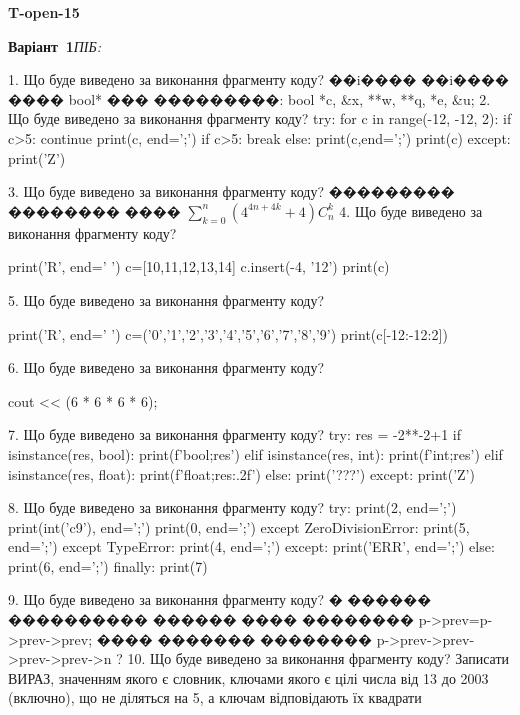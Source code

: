 \documentclass[11pt]{article}
\begin{document}
{\large\textbf{T-open-15}}

\textbf{Варіант \No\,1}\hfill \textit{ПІБ:}\,\underline{\hspace{60mm}}
\vspace{4mm}

1. Що буде виведено за виконання фрагменту коду?
��i���� ��i���� ���� bool* ��� ���������: bool *c, &x, **w, **q, *e, &u;
2. Що буде виведено за виконання фрагменту коду?
try:
    for c in range(-12, -12, 2):
        if c>5:
            continue
        print(c, end=';')
        if c>5:
            break
    else:
        print(c,end=';')
    print(c)
except:
    print('Z')

3. Що буде виведено за виконання фрагменту коду?
��������� �������� ���� {$\sum\limits_{k=0}^{n} \left({{4^{4n+4k}}+4}\right){C_n^k}$}
4. Що буде виведено за виконання фрагменту коду?

print('R', end=' ')
c=[10,11,12,13,14]
c.insert(-4, '12')
print(c)


5. Що буде виведено за виконання фрагменту коду?

print('R', end=' ')
c=('0','1','2','3','4','5','6','7','8','9')
print(c[-12:-12:2])


6. Що буде виведено за виконання фрагменту коду?

cout << (6 * 6 * 6 * 6);

7. Що буде виведено за виконання фрагменту коду?
try:
    res = -2**-2+1
    if isinstance(res, bool):
        print(f'bool;{res}')
    elif isinstance(res, int):
        print(f'int;{res}')
    elif isinstance(res, float):
        print(f'float;{res:.2f}')
    else:
        print('???')
except:
    print('Z')

8. Що буде виведено за виконання фрагменту коду?
try:
    print(2, end=';')
    print(int('c9'), end=';')
    print(0, end=';')
except ZeroDivisionError:
    print(5, end=';')
except TypeError:
    print(4, end=';')
except:
    print('ERR', end=';')
else:
    print(6, end=';')
finally:
    print(7)

9. Що буде виведено за виконання фрагменту коду?
� ������ ���������� ������ ���� �������� p->prev=p->prev->prev;
���� ������� �������� p->prev->prev->prev->prev->n ?
10. Що буде виведено за виконання фрагменту коду?
Записати ВИРАЗ, значенням якого є словник, ключами якого є цілі числа від 13 до 2003 (включно), що не діляться на 5, а ключам відповідають їх квадрати 
\end{document}
